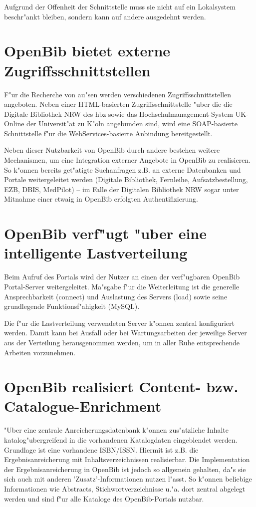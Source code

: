 \documentclass[11pt, twoside, a4paper, BCOR8mm, DIV12, bibtotoc,idxtotoc]{scrbook}
\begin{document}
\begin{itemize}
Aufgrund der Offenheit der Schnittstelle muss sie nicht auf ein
Lokalsystem beschr"ankt bleiben, sondern kann auf andere ausgedehnt
werden.
\section{OpenBib bietet externe Zugriffsschnittstellen}
F"ur die Recherche von au"sen werden verschiedenen
Zugriffsschnittstellen angeboten. Neben einer HTML-basierten
Zugriffsschnittstelle "uber die die Digitale Bibliothek NRW des hbz
sowie das Hochschulmanagement-System UK-Online der Universit"at zu
K"oln angebunden sind, wird eine SOAP-basierte Schnittstelle f"ur die
WebServices-basierte Anbindung bereitgestellt.

Neben dieser Nutzbarkeit von OpenBib durch andere bestehen weitere
Mechanismen, um eine Integration externer Angebote in OpenBib zu
realisieren. So k"onnen bereits get"atigte Suchanfragen z.B. an
externe Datenbanken und Portale weitergeleitet werden (Digitale
Bibliothek, Fernleihe, Aufsatzbestellung, EZB, DBIS, MedPilot) -- im
Falle der Digitalen Bibliothek NRW sogar unter Mitnahme einer etwaig
in OpenBib erfolgten Authentifizierung.

\section{OpenBib verf"ugt "uber eine intelligente Lastverteilung}
Beim Aufruf des Portals wird der Nutzer an einen der verf"ugbaren
OpenBib Portal-Server weitergeleitet. Ma"sgabe f"ur die Weiterleitung
ist die generelle Ansprechbarkeit (connect) und Auslastung des Servers
(load) sowie seine grundlegende Funktionsf"ahigkeit (MySQL).

Die f"ur die Lastverteilung verwendeten Server k"onnen zentral
konfiguriert werden. Damit kann bei Ausfall oder bei
Wartungsarbeiten der jeweilige Server aus der Verteilung
herausgenommen werden, um in aller Ruhe entsprechende Arbeiten
vorzunehmen.

\section{OpenBib realisiert Content- bzw. Catalogue-Enrichment}
"Uber eine zentrale Anreicherungsdatenbank k"onnen zus"atzliche
Inhalte katalog"ubergreifend in die vorhandenen Katalogdaten
eingeblendet werden. Grundlage ist eine vorhandene ISBN/ISSN. Hiermit
ist z.B. die Ergebnisanreicherung mit Inhaltsverzeichnissen
realisierbar. Die Implementation der Ergebnisanreicherung in OpenBib
ist jedoch so allgemein gehalten, da"s sie sich auch mit anderen
'Zusatz'-Informationen nutzen l"asst. So k"onnen beliebige
Informationen wie Abstracts, Stichwortverzeichnisse u."a. dort zentral
abgelegt werden und sind f"ur alle Kataloge des OpenBib-Portals
nutzbar.


\end{itemize}
\end{document}
